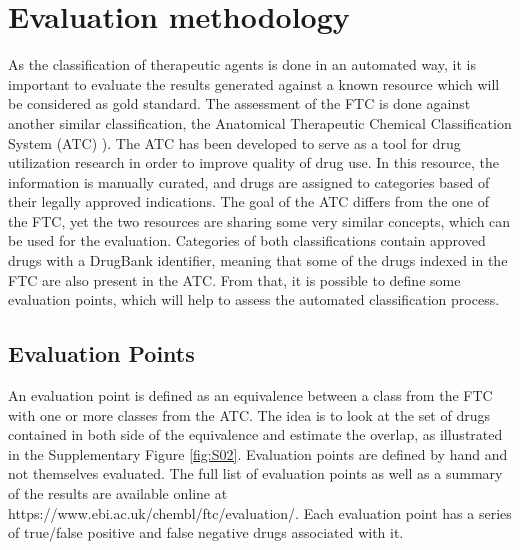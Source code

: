 \documentclass{bioinfo}
\begin{document}
\section{Evaluation methodology}
As the classification of therapeutic agents is done in an automated way, it 
is important to evaluate the results generated against a known resource which will be 
considered as gold standard. The assessment of the FTC is done against another similar 
classification, the Anatomical Therapeutic Chemical Classification System (ATC) \citep{world2000anatomical}). 
The ATC has been developed to serve as a tool for drug utilization research in order to 
improve quality of drug use. In this resource, the information is manually curated, and drugs 
are assigned to categories based of their legally approved indications. The goal of the ATC differs 
from the one of the FTC, yet the two resources are sharing some very similar concepts, which can be 
used for the evaluation. Categories of both classifications contain approved drugs with a DrugBank 
identifier, meaning that some of the drugs indexed in the FTC are also present in the ATC. From that, 
it is possible to define some evaluation points, which will help to assess the automated classification process.

\subsection{Evaluation Points}
An evaluation point is defined as an equivalence between a class from the FTC with one or 
more classes from the ATC. The idea is to look at the set of drugs contained in both side of the 
equivalence and estimate the overlap, as illustrated in the Supplementary Figure \ref{fig:S02}. Evaluation points are defined 
by hand and not themselves evaluated. The full list of evaluation points as well as a summary of the results 
are available online at https://www.ebi.ac.uk/chembl/ftc/evaluation/. Each evaluation point has a series of 
true/false positive and false negative drugs associated with it.
 
\end{document}
